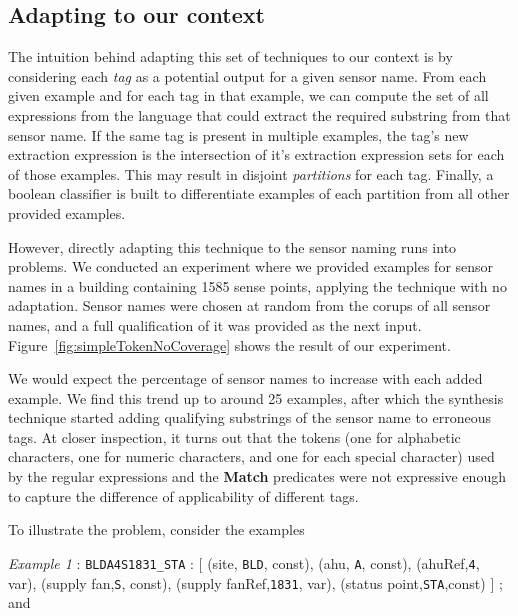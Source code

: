 %
%
%

\subsection{Adapting to our context}

The intuition behind adapting this set of techniques to our context is by considering each {\it tag} as a potential output for a given sensor name. From each given example and for each tag in that example, we can compute the set of all expressions from the language that could extract the required substring from that sensor name. If the same tag is present in multiple examples, the tag's new extraction expression is the intersection of it's extraction expression sets for each of those examples. This may result in disjoint {\it partitions} for each tag. Finally, a boolean classifier is built to differentiate examples of each partition from all other provided examples. 

However, directly adapting this technique to the sensor naming runs into problems. We conducted an experiment where we provided examples for sensor names in a building containing 1585 sense points, applying the technique with no adaptation. Sensor names were chosen at random from the corups of all sensor names, and a full qualification of it was provided as the next input. Figure~\ref{fig:simpleTokenNoCoverage} shows the result of our experiment.

We would expect the percentage of sensor names to increase with each added example. We find this trend up to around 25 examples, after which the synthesis technique started adding qualifying substrings of the sensor name to erroneous tags. At closer inspection, it turns out that the tokens  (one for alphabetic characters, one for numeric characters, and one for each special character) used by the regular expressions and the {\bf Match} predicates were not expressive enough to capture the difference of applicability of different tags. 

To illustrate the problem, consider the examples 

{\it Example 1} : \texttt{BLDA4S1831\_STA} : [ (site, \texttt{BLD}, const), (ahu, \texttt{A}, const), (ahuRef,\texttt{4}, var), (supply fan,\texttt{S}, const), (supply fanRef,\texttt{1831}, var), (status point,\texttt{STA},const) ] ; and 

